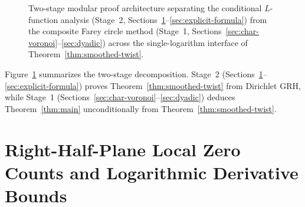 \documentclass[11pt,reqno]{amsart}
\numberwithin{equation}{section}
\theoremstyle{definition}
\newcommand{\1}{\mathbf{1}}
\newcommand{\GRH}{\textup{GRH}}
\begin{document}
\begin{figure}[htbp]
{%
}
\caption{Two-stage modular proof architecture separating the conditional $L$-function analysis (Stage~2, Sections~\ref{sec:local-logderiv}--\ref{sec:explicit-formula}) from the composite Farey circle method (Stage~1, Sections~\ref{sec:char-voronoi}--\ref{sec:dyadic}) across the single-logarithm interface of Theorem~\ref{thm:smoothed-twist}.}
\label{fig:architecture}
\end{figure}

Figure~\ref{fig:architecture} summarizes the two-stage decomposition. Stage~2 (Sections~\ref{sec:local-logderiv}--\ref{sec:explicit-formula}) proves Theorem~\ref{thm:smoothed-twist} from Dirichlet \GRH{}, while Stage~1 (Sections~\ref{sec:char-voronoi}--\ref{sec:dyadic}) deduces Theorem~\ref{thm:main} unconditionally from Theorem~\ref{thm:smoothed-twist}.

\section{Right-Half-Plane Local Zero Counts and Logarithmic Derivative Bounds}
\label{sec:local-logderiv}
\end{document}
